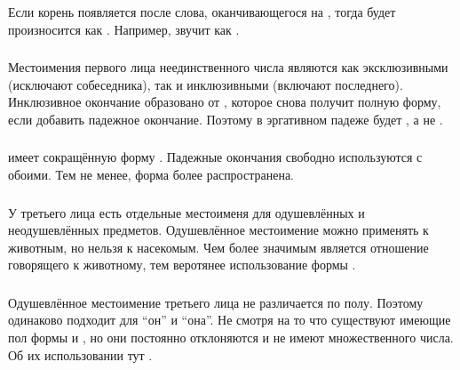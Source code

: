 Если корень  появляется после слова, оканчивающегося на , тогда  будет про\-из\-но\-сит\-ся как . Например,  звучит как .

\subsubsection{} Местоимения первого лица неединственного числа являются как эксклюзивными (исключают собеседника), так и инклюзивными (включают последнего). Инклюзивное окончание  образовано от , которое снова получит полную форму, если добавить падежное окончание.
Поэтому  в эргативном падеже будет , а не .

\subsubsection{}  имеет сокращённую форму .
Падежные окончания свободно ис\-поль\-зу\-ют\-ся с обоими. Тем не менее, форма  более распространена.

\subsubsection{} У третьего лица есть отдельные местоименя для одушевлённых и неоду\-шев\-лён\-ных предметов. Одушевлённое местоимение  можно применять к животным, но нельзя к насекомым. Чем более значимым является отношение говорящего к животному, тем веротянее использование формы .

\subsubsection{} Одушевлённое местоимение третьего лица  не различается по полу. Поэтому одинаково подходит для ``он'' и ``она''.  Не смотря на то что существуют имеющие пол формы   и 
, но они постоянно отклоняются и не имеют множественного числа.  Об их использовании тут  .
\label{morph:pron:gender}

